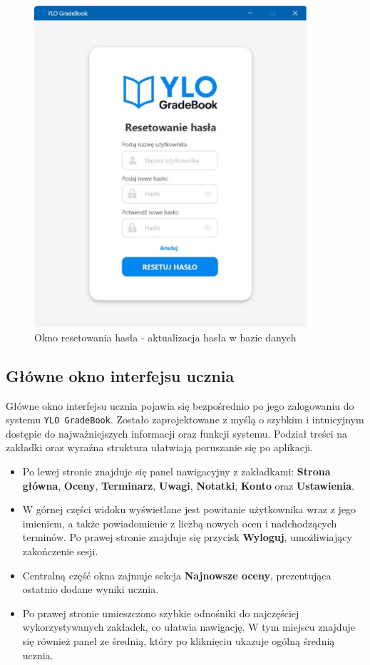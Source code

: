 \begin{figure}[H]
    \centering
    \includegraphics[width=0.9\textwidth]{figures/fig_0006.eps}
    \caption{Okno resetowania hasła - aktualizacja hasła w bazie danych}
    \label{fig:passwordReset}
\end{figure}


\subsection{Główne okno interfejsu ucznia}

Główne okno interfejsu ucznia pojawia się bezpośrednio po jego zalogowaniu do systemu \texttt{YLO GradeBook}. Zostało zaprojektowane z myślą o szybkim i intuicyjnym dostępie do najważniejszych informacji oraz funkcji systemu. Podział treści na zakładki oraz wyraźna struktura ułatwiają poruszanie się po aplikacji.

\begin{itemize}
    \item Po lewej stronie znajduje się panel nawigacyjny z zakładkami: \textbf{Strona główna}, \textbf{Oceny}, \textbf{Terminarz}, \textbf{Uwagi}, \textbf{Notatki}, \textbf{Konto} oraz \textbf{Ustawienia}.
    \item W górnej części widoku wyświetlane jest powitanie użytkownika wraz z jego imieniem, a także powiadomienie z liczbą nowych ocen i nadchodzących terminów. Po prawej stronie znajduje się przycisk \textbf{Wyloguj}, umożliwiający zakończenie sesji.
    \item Centralną część okna zajmuje sekcja \textbf{Najnowsze oceny}, prezentująca ostatnio dodane wyniki ucznia.
    \item Po prawej stronie umieszczono szybkie odnośniki do najczęściej wykorzystywanych zakładek, co ułatwia nawigację. W tym miejscu znajduje się również panel ze średnią, który po kliknięciu ukazuje ogólną średnią ucznia.
\end{itemize}

